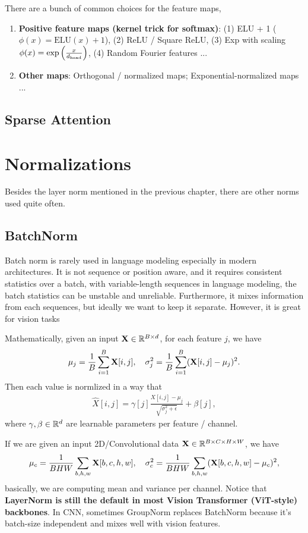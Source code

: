 \documentclass[11pt]{article}  %
\begin{document}
There are a bunch of common choices for the feature maps, 
\begin{enumerate}
  \item \textbf{Positive feature maps (kernel trick for softmax)}: (1) ELU + 1 ($\phi(x) = \text{ELU}(x) + 1$), (2) ReLU / Square ReLU, (3) Exp with scaling $\phi(x) = \exp\left( \frac{x}{d_{\text{head}}} \right)$, (4) Random Fourier features ...
  \item \textbf{Other maps}: Orthogonal / normalized maps; Exponential-normalized maps ...
\end{enumerate}



\subsection{Sparse Attention}


\section{Normalizations}
Besides the layer norm mentioned in the previous chapter, there are other norms used quite often.

\subsection{BatchNorm}
Batch norm is rarely used in language modeling especially in modern architectures. 
It is not sequence or position aware, and it requires consistent statistics over a batch, with variable-length sequences in language modeling, the batch statistics can be unstable and unreliable.
Furthermore, it mixes information from each sequences, but ideally we want to keep it separate. 
However, it is great for vision tasks

Mathematically, given an input $\mathbf{X} \in \mathbb{R}^{B \times d}$, for each feature $j$, we have 
\begin{align*}
  \mu_j = \frac{1}{B}\sum_{i=1}^{B}\mathbf{X}[i, j], \quad \sigma^2_j = \frac{1}{B}\sum_{i=1}^{B}(\mathbf{X}[i, j] - \mu_j)^2.
\end{align*}
Then each value is normlized in a way that 
\begin{align*}
  \hat{X}[i, j] = \gamma[j] \frac{X[i, j] - \mu_j}{\sqrt{\sigma_j^2 + \epsilon}} + \beta[j],
\end{align*}
where $\gamma, \beta \in \mathbb{R}^d$ are learnable parameters per feature / channel.

If we are given an input 2D/Convolutional data $\mathbf{X} \in \mathbb{R}^{B \times C \times H \times W}$, we have 
\begin{align*}
  \mu_c = \frac{1}{BHW}\sum_{b,h,w}\mathbf{X}[b, c, h, w], \quad \sigma_c^2 = \frac{1}{BHW}\sum_{b,h,w}(\mathbf{X}[b, c, h, w] - \mu_c)^2,
\end{align*}
basically, we are computing mean and variance per channel.
Notice that \textbf{LayerNorm is still the default in most Vision Transformer (ViT-style) backbones}. 
In CNN, sometimes GroupNorm replaces BatchNorm because it's batch-size independent and mixes well with vision features.
\end{document}

